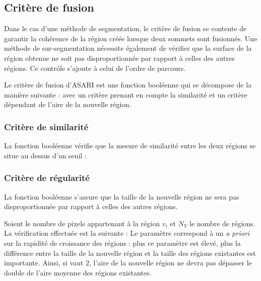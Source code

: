 \subsection{Critère de fusion}
\label{sec:critfusion}

Dans le cas d'une méthode de segmentation, le critère de fusion se contente de garantir la cohérence de la région créée lorsque deux sommets sont fusionnés. Une méthode de sur-segmentation nécessite également de vérifier que la surface de la région obtenue ne soit pas disproportionnée par rapport à celles des autres régions. Ce contrôle s'ajoute à celui de l'ordre de parcours. 

Le critère de fusion d'ASARI est une fonction booléenne qui se décompose de la manière suivante : 
avec  un critère prenant en compte la similarité et  un critère dépendant de l'aire de la nouvelle région. 

\subsubsection{Critère de similarité}
\label{subsec:asari:critSim}
La fonction booléenne  vérifie que la mesure de similarité entre les deux régions se situe au dessus d'un seuil :

\subsubsection{Critère de régularité}
\label{subsec:asari:critReg}
La fonction booléenne  s'assure que la taille de la nouvelle région ne sera pas disproportionnée par rapport à celles des autres régions.

Soient  le nombre de pixels appartenant à la région $v_{i}$ et $N_{V}$ le nombre de régions. La vérification effectuée est la suivante :
Le paramètre  correspond à un \textit{a priori} sur la rapidité de croissance des régions : plus ce paramètre est élevé, plus la différence entre la taille de la nouvelle région et la taille des régions existantes est importante. Ainsi, si  vaut $2$, l'aire de la nouvelle région ne devra pas dépasser le double de l'aire moyenne des régions existantes.

